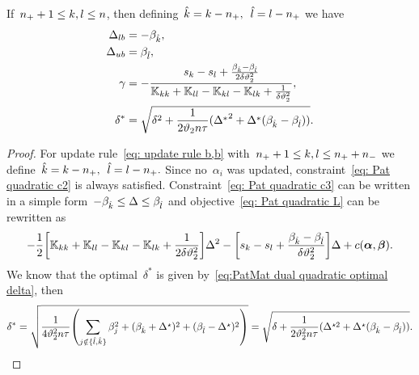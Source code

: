 \begin{lemma}
  If~$n_{+} + 1\le k,l \le n$, then defining~$\hat{k} = k - n_{+},$~$\hat{l} = l - n_{+}$ we have
  \begin{align*}
    \Delta_{lb} & = - \beta_{\hat{k}}, \\
    \Delta_{ub} & = \beta_{\hat{l}}, \\
    \gamma      & = -\frac{s_k - s_l + \frac{\beta_{\hat{k}} - \beta_{\hat{l}}}{2\delta \vartheta_2^2}}{\mathbb{K}_{kk} + \mathbb{K}_{ll} - \mathbb{K}_{kl} - \mathbb{K}_{lk} + \frac{1}{\delta \vartheta_2^2}}, \\
    \delta^{*}  & = \sqrt{\delta^2 + \frac{1}{2 \vartheta_2 n \tau}({\Delta^{*}}^2 + \Delta^{*} (\beta_{\hat{k}} - \beta_{\hat{l}}))}.
  \end{align*}
\end{lemma}

\begin{proof}
  For update rule~\eqref{eq: update rule b,b} with~$n_{+} + 1\le k,l \le n_{+} + n_{-}$ we define~$\hat{k} = k - n_{+},$~$\hat{l} = l - n_{+}.$ Since no~$\alpha_i$ was updated, constraint~\eqref{eq: Pat quadratic c2} is always satisfied. Constraint~\eqref{eq: Pat quadratic c3} can be written in a simple form~$-\beta_{\hat{k}} \leq \Delta \leq \beta_{\hat{l}}$ and objective~\eqref{eq: Pat quadratic L} can be rewritten as
  \begin{equation*}
    - \frac{1}{2} \Brac[s]{\K_{kk} + \K_{ll} - \K_{kl} - \K_{lk} + \frac{1}{2\delta\vartheta_2^2}} \Delta^2 - \Brac[s]{s_k - s_l + \frac{\betak - \betal}{\delta\vartheta_2^2}} \Delta + c(\bm{\alpha}, \bm{\beta}).
  \end{equation*}
  We know that the optimal~$\delta^*$ is given by~\eqref{eq:PatMat dual quadratic optimal delta}, then
  \begin{equation*}
    \delta^*
    = \sqrt{\frac{1}{4\vartheta_2^2 n \tau} \Brac{\sum_{j \notin \{\hat{l}, \hat{k}\}} \beta_j^2 + (\betak + \Delta^\star)^2 + (\betal - \Delta^\star)^2}} 
    = \sqrt{\delta + \frac{1}{2\vartheta_2^2 n \tau} (\Delta^{\star2} + \Delta^\star (\betak - \betal))}.
  \end{equation*}
\end{proof}